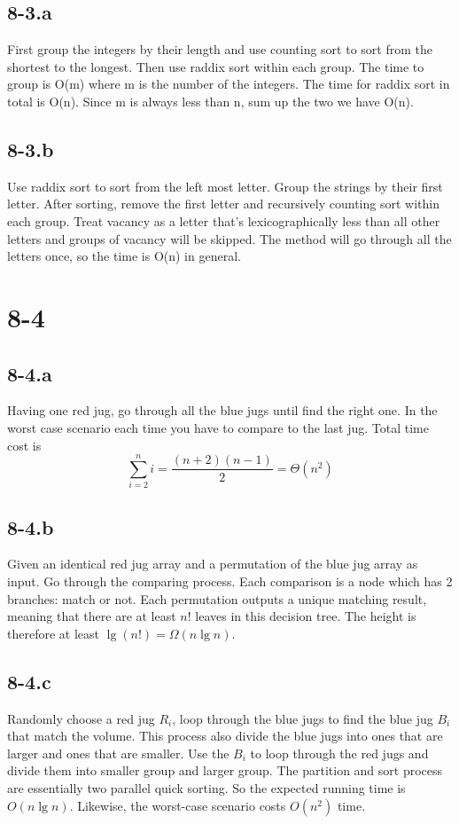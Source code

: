 \documentclass{article}
\begin{document}
	\subsection*{8-3.a}
	First group the integers by their length and use counting sort to sort from the shortest to the longest. Then use raddix sort within each group. The time to group is O(m) where m is the number of the integers. The time for raddix sort in total is O(n). Since m is always less than n, sum up the two we have O(n).
	\subsection*{8-3.b}
	 Use raddix sort to sort from the left most letter. Group the strings by their first letter. After sorting, remove the first letter and recursively counting sort within each group. Treat vacancy as a letter that's lexicographically less than all other letters and groups of vacancy will be skipped. The method will go through all the letters once, so the time is O(n) in general.
	 \section*{8-4}
	 \subsection*{8-4.a}
	 Having one red jug, go through all the blue jugs until find the right one. In the worst case scenario each time you have to compare to the last jug. Total time cost is 
	 $$\sum_{i =2}^{n} i = \frac{(n+2)(n-1)}{2} = \Theta(n^2)$$
	 \subsection*{8-4.b}
	 Given an identical red jug array and a permutation of the blue jug array as input. Go through the comparing process. Each comparison is a node which has 2 branches: match or not. Each permutation outputs a unique matching result, meaning that there are at least $n!$ leaves in this decision tree. The height is therefore at least $\lg(n!) = \Omega(n\lg n)$.
	 \subsection*{8-4.c}
	 Randomly choose a red jug $R_i$, loop through the blue jugs to find the blue jug $B_i$ that match the volume. This process also divide the blue jugs into ones that are larger and ones that are smaller. Use the $B_i$ to loop through the red jugs and divide them into smaller group and larger group. The partition and sort process are essentially two parallel quick sorting. So the expected running time is $O(n\lg n)$. Likewise, the worst-case scenario costs $O(n^2)$ time.
\end{document}
